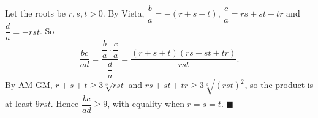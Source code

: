 Let the roots be $r,s,t>0$. By Vieta, $\dfrac ba=-(r+s+t)$, $\dfrac ca=rs+st+tr$ and $\dfrac da=-rst$. So
\[\dfrac{bc}{ad}=\dfrac{\dfrac ba\cdot\dfrac ca}{\dfrac da}=\dfrac{(r+s+t)(rs+st+tr)}{rst}.\]
By AM-GM, $r+s+t\ge3\sqrt[3]{rst}$ and $rs+st+tr\ge3\sqrt[3]{(rst)^2}$, so the product is at least $9rst$. Hence $\dfrac{bc}{ad}\ge9$, with equality when $r=s=t$. $\blacksquare$
